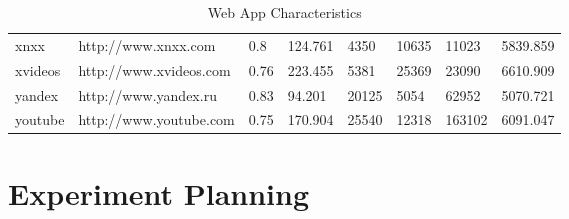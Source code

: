 \begin{table}[]
{\begin{tabular}{|l|l|l|l|l|l|l|l|}
xnxx              & http://www.xnxx.com        & 0.8                                                                                 & 124.761                                                                           & 4350                                                           & 10635                                                         & 11023                                                                & 5839.859                                                                       \\
\rowcolor[HTML]{EFEFEF} 
xvideos           & http://www.xvideos.com     & 0.76                                                                                & 223.455                                                                           & 5381                                                           & 25369                                                         & 23090                                                                & 6610.909                                                                       \\
yandex            & http://www.yandex.ru       & 0.83                                                                                & 94.201                                                                            & 20125                                                          & 5054                                                          & 62952                                                                & 5070.721                                                                       \\
\rowcolor[HTML]{EFEFEF} 
youtube           & http://www.youtube.com     & 0.75                                                                                & 170.904                                                                           & 25540                                                          & 12318                                                         & 163102                                                               & 6091.047                                                                       \\ \hline
\end{tabular}%
}

\caption{Web App Characteristics}
    \label{tab:design}
\end{table}



\section{Experiment Planning}


